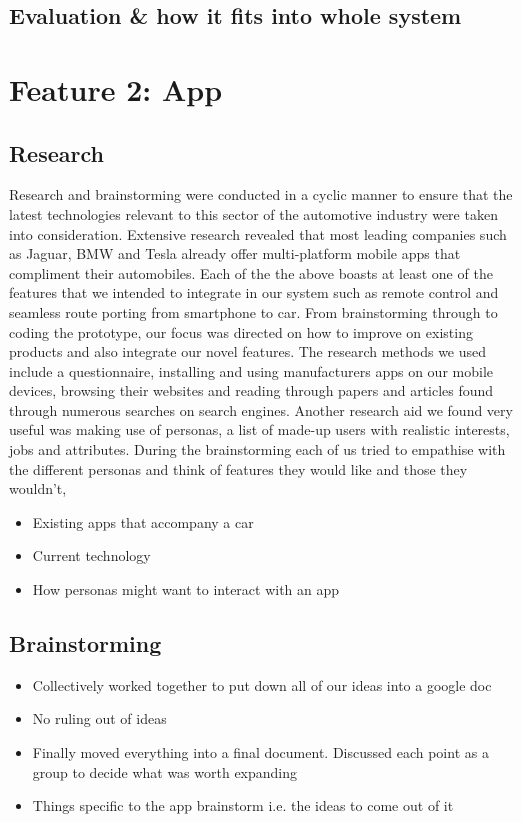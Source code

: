 \documentclass{article}
\begin{document}
\subsection{Evaluation \& how it fits into whole system} \label{ssec:nav-evaluation}

\section{Feature 2: App} \label{sec:app}
\subsection{Research} \label{}
Research and brainstorming were conducted in a cyclic manner to ensure that the latest technologies relevant to this sector of the automotive industry were taken into consideration. Extensive research revealed that most leading companies such as Jaguar, BMW and Tesla already offer multi-platform mobile apps that compliment their automobiles. Each of the the above boasts at least one of the features that we intended to integrate in our system such as remote control and seamless route porting from smartphone to car. From brainstorming through to coding the prototype, our focus was directed on how to improve on existing products and also integrate our novel features. 
The research methods we used include a questionnaire, installing and using manufacturers apps on our mobile devices, browsing their websites and reading through papers and articles found through numerous searches on search engines. Another research aid we found very useful was making use of personas, a list of made-up users with realistic interests, jobs and attributes. During the brainstorming each of us tried to empathise with the different personas and think of features they would like and those they wouldn't, 
	\begin{itemize}
		\item Existing apps that accompany a car
        \item Current technology
		\item How personas might want to interact with an app
	\end{itemize}
\subsection{Brainstorming}
	\begin{itemize}
		\item Collectively worked together to put down all of our ideas into a google doc
		\item No ruling out of ideas
		\item Finally moved everything into a final document. Discussed each point as a group to decide what was worth expanding
        \item Things specific to the app brainstorm i.e. the ideas to come out of it
	\end{itemize}
\end{document}
